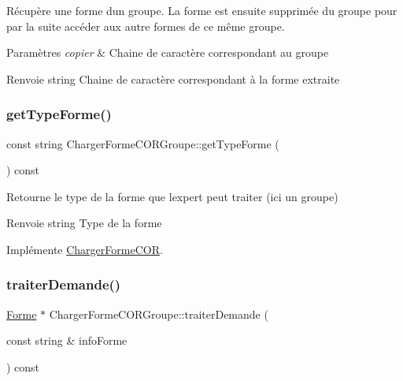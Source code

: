 Récupère une forme d\textquotesingle{}un groupe. La forme est ensuite supprimée du groupe pour par la suite accéder aux autre formes de ce même groupe. 


\begin{DoxyParams}{Paramètres}
{\em copier} & Chaine de caractère correspondant au groupe \\
\hline
\end{DoxyParams}
\begin{DoxyReturn}{Renvoie}
string Chaine de caractère correspondant à la forme extraite 
\end{DoxyReturn}
\mbox{\label{class_charger_forme_c_o_r_groupe_a202dfd1ec95bc7a20daeb66a92452a11}} 
\subsubsection{\texorpdfstring{getTypeForme()}{getTypeForme()}}
{\footnotesize\ttfamily const string Charger\+Forme\+C\+O\+R\+Groupe\+::get\+Type\+Forme (\begin{DoxyParamCaption}{ }\end{DoxyParamCaption}) const\hspace{0.3cm}{\ttfamily [virtual]}}



Retourne le type de la forme que l\textquotesingle{}expert peut traiter (ici un groupe) 

\begin{DoxyReturn}{Renvoie}
string Type de la forme 
\end{DoxyReturn}


Implémente \mbox{\hyperlink{class_charger_forme_c_o_r_ae740eabcd9b3cc3809c1fe5ffd0100a1}{Charger\+Forme\+C\+OR}}.

\mbox{\label{class_charger_forme_c_o_r_groupe_ab28f5a9e7a8fe306c98aa3f1f8b775e4}} 
\subsubsection{\texorpdfstring{traiterDemande()}{traiterDemande()}}
{\footnotesize\ttfamily \mbox{\hyperlink{class_forme}{Forme}} $\ast$ Charger\+Forme\+C\+O\+R\+Groupe\+::traiter\+Demande (\begin{DoxyParamCaption}\item[{const string \&}]{info\+Forme }\end{DoxyParamCaption}) const\hspace{0.3cm}{\ttfamily [virtual]}}



